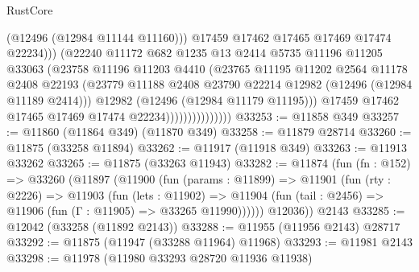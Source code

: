 \begin{lexlean}{RustCore}
\begin{coremodule}
                                      (@12496 (@12984 @11144 @11160)))
                                    @17459
                                    @17462
                                    @17465
                                    @17469
                                    @17474
                                    @22234)))
                              (@22240
                                @11172
                                @682
                                @1235
                                @13
                                @2414
                                @5735
                                @11196
                                @11205
                                @33063
                                (@23758
                                  @11196
                                  @11203
                                  @4410
                                  (@23765
                                    @11195
                                    @11202
                                    @2564
                                    @11178
                                    @2408
                                    @22193
                                    (@23779
                                      @11188
                                      @2408
                                      @23790
                                      @22214
                                      @12982
                                      (@12496 (@12984 @11189 @2414)))
                                    @12982
                                    (@12496 (@12984 @11179 @11195)))
                                  @17459
                                  @17462
                                  @17465
                                  @17469
                                  @17474
                                  @22234)))))))))))))))
@33253 := @11858 @349
@33257 := @11860 (@11864 @349) (@11870 @349)
@33258 := @11879 @28714
@33260 := @11875 (@33258 @11894)
@33262 := @11917 (@11918 @349)
@33263 := @11913 @33262
@33265 := @11875 (@33263 @11943)
@33282 := @11874
    (fun (fn : @152) =>
    @33260
      (@11897
        (@11900
          (fun (params : @11899) =>
          @11901
            (fun (rty : @2226) =>
            @11903
              (fun (lets : @11902) =>
              @11904 (fun (tail : @2456) => @11906 (fun (Γ : @11905) => @33265 @11990))))))
        @12036))
    @2143
@33285 := @12042 (@33258 (@11892 @2143))
@33288 := @11955 (@11956 @2143) @28717
@33292 := @11875 (@11947 (@33288 @11964) @11968)
@33293 := @11981 @2143
@33298 := @11978 (@11980 @33293 @28720 @11936 @11938)

\end{coremodule}
\end{lexlean}
